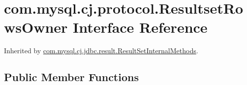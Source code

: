 \hypertarget{interfacecom_1_1mysql_1_1cj_1_1protocol_1_1_resultset_rows_owner}{}\section{com.\+mysql.\+cj.\+protocol.\+Resultset\+Rows\+Owner Interface Reference}
\label{interfacecom_1_1mysql_1_1cj_1_1protocol_1_1_resultset_rows_owner}


Inherited by \mbox{\hyperlink{interfacecom_1_1mysql_1_1cj_1_1jdbc_1_1result_1_1_result_set_internal_methods}{com.\+mysql.\+cj.\+jdbc.\+result.\+Result\+Set\+Internal\+Methods}}.

\subsection*{Public Member Functions}
